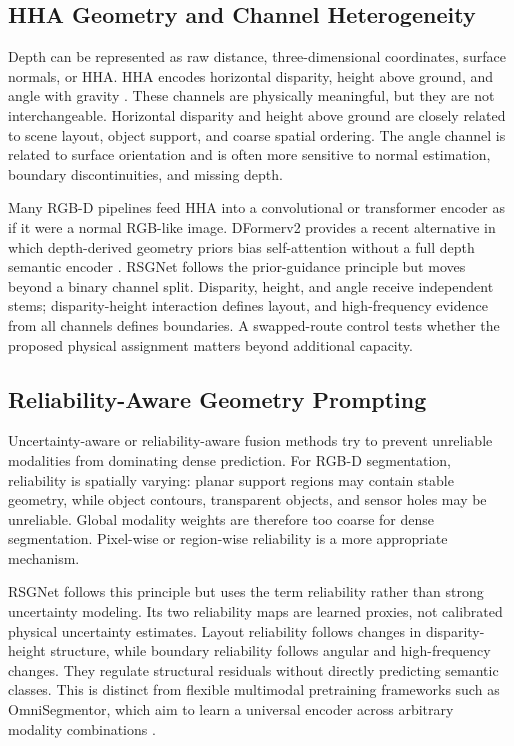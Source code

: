 \documentclass[a4paper,fleqn]{cas-dc}
\begin{document}
\subsection{HHA Geometry and Channel Heterogeneity}

Depth can be represented as raw distance, three-dimensional coordinates, surface normals, or HHA. HHA encodes horizontal disparity, height above ground, and angle with gravity \citep{gupta2014hha}. These channels are physically meaningful, but they are not interchangeable. Horizontal disparity and height above ground are closely related to scene layout, object support, and coarse spatial ordering. The angle channel is related to surface orientation and is often more sensitive to normal estimation, boundary discontinuities, and missing depth.

Many RGB-D pipelines feed HHA into a convolutional or transformer encoder as if it were a normal RGB-like image. DFormerv2 provides a recent alternative in which depth-derived geometry priors bias self-attention without a full depth semantic encoder \citep{yin2025dformerv2}. RSGNet follows the prior-guidance principle but moves beyond a binary channel split. Disparity, height, and angle receive independent stems; disparity-height interaction defines layout, and high-frequency evidence from all channels defines boundaries. A swapped-route control tests whether the proposed physical assignment matters beyond additional capacity.

\subsection{Reliability-Aware Geometry Prompting}

Uncertainty-aware or reliability-aware fusion methods try to prevent unreliable modalities from dominating dense prediction. For RGB-D segmentation, reliability is spatially varying: planar support regions may contain stable geometry, while object contours, transparent objects, and sensor holes may be unreliable. Global modality weights are therefore too coarse for dense segmentation. Pixel-wise or region-wise reliability is a more appropriate mechanism.

RSGNet follows this principle but uses the term reliability rather than strong uncertainty modeling. Its two reliability maps are learned proxies, not calibrated physical uncertainty estimates. Layout reliability follows changes in disparity-height structure, while boundary reliability follows angular and high-frequency changes. They regulate structural residuals without directly predicting semantic classes. This is distinct from flexible multimodal pretraining frameworks such as OmniSegmentor, which aim to learn a universal encoder across arbitrary modality combinations \citep{yin2025omnisegmentor}.
\end{document}
